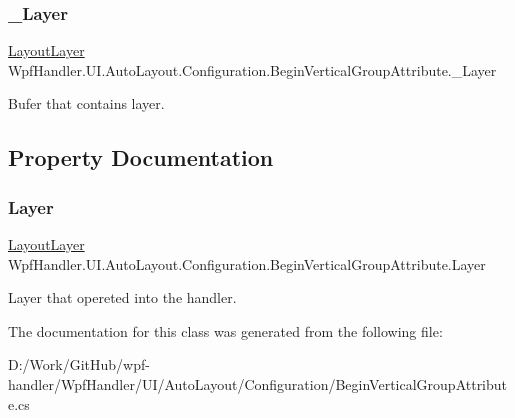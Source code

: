 \subsubsection{\texorpdfstring{\+\_\+\+Layer}{\_Layer}}
{\footnotesize\ttfamily \mbox{\hyperlink{class_wpf_handler_1_1_u_i_1_1_auto_layout_1_1_layout_layer}{Layout\+Layer}} Wpf\+Handler.\+U\+I.\+Auto\+Layout.\+Configuration.\+Begin\+Vertical\+Group\+Attribute.\+\_\+\+Layer\hspace{0.3cm}{\ttfamily [private]}}



Bufer that contains layer. 



\subsection{Property Documentation}
\mbox{\label{class_wpf_handler_1_1_u_i_1_1_auto_layout_1_1_configuration_1_1_begin_vertical_group_attribute_aba42e4648d684e4a0091d4157e58c19d}} 
\subsubsection{\texorpdfstring{Layer}{Layer}}
{\footnotesize\ttfamily \mbox{\hyperlink{class_wpf_handler_1_1_u_i_1_1_auto_layout_1_1_layout_layer}{Layout\+Layer}} Wpf\+Handler.\+U\+I.\+Auto\+Layout.\+Configuration.\+Begin\+Vertical\+Group\+Attribute.\+Layer\hspace{0.3cm}{\ttfamily [get]}}



Layer that opereted into the handler. 



The documentation for this class was generated from the following file\+:\begin{DoxyCompactItemize}
\item 
D\+:/\+Work/\+Git\+Hub/wpf-\/handler/\+Wpf\+Handler/\+U\+I/\+Auto\+Layout/\+Configuration/Begin\+Vertical\+Group\+Attribute.\+cs\end{DoxyCompactItemize}
